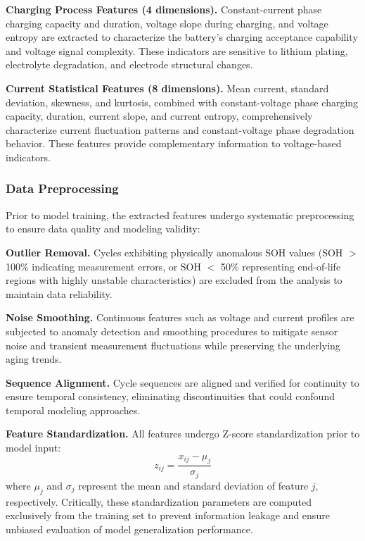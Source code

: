 \documentclass[5p,times]{elsarticle}
\begin{document}
\textbf{Charging Process Features (4 dimensions).} Constant-current phase charging capacity and duration, voltage slope during charging, and voltage entropy are extracted to characterize the battery's charging acceptance capability and voltage signal complexity. These indicators are sensitive to lithium plating, electrolyte degradation, and electrode structural changes.

\textbf{Current Statistical Features (8 dimensions).} Mean current, standard deviation, skewness, and kurtosis, combined with constant-voltage phase charging capacity, duration, current slope, and current entropy, comprehensively characterize current fluctuation patterns and constant-voltage phase degradation behavior. These features provide complementary information to voltage-based indicators.

\subsubsection{Data Preprocessing}

Prior to model training, the extracted features undergo systematic preprocessing to ensure data quality and modeling validity:

\textbf{Outlier Removal.} Cycles exhibiting physically anomalous SOH values (SOH $>$ 100\% indicating measurement errors, or SOH $<$ 50\% representing end-of-life regions with highly unstable characteristics) are excluded from the analysis to maintain data reliability.

\textbf{Noise Smoothing.} Continuous features such as voltage and current profiles are subjected to anomaly detection and smoothing procedures to mitigate sensor noise and transient measurement fluctuations while preserving the underlying aging trends.

\textbf{Sequence Alignment.} Cycle sequences are aligned and verified for continuity to ensure temporal consistency, eliminating discontinuities that could confound temporal modeling approaches.

\textbf{Feature Standardization.} All features undergo Z-score standardization prior to model input:
\begin{equation}
    z_{ij} = \frac{x_{ij} - \mu_j}{\sigma_j}
\end{equation}
where $\mu_j$ and $\sigma_j$ represent the mean and standard deviation of feature $j$, respectively. Critically, these standardization parameters are computed exclusively from the training set to prevent information leakage and ensure unbiased evaluation of model generalization performance.
\end{document}
